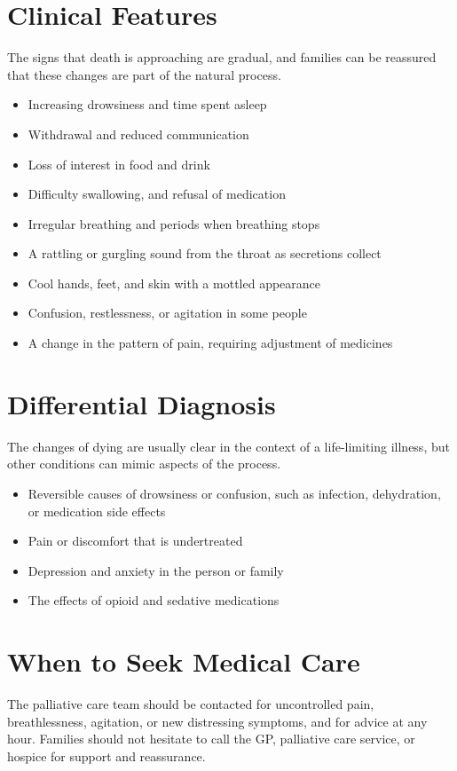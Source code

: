 \section*{Clinical Features}
The signs that death is approaching are gradual, and families can be reassured that these changes are part of the natural process.
\begin{itemize}
    \item Increasing drowsiness and time spent asleep
    \item Withdrawal and reduced communication
    \item Loss of interest in food and drink
    \item Difficulty swallowing, and refusal of medication
    \item Irregular breathing and periods when breathing stops
    \item A rattling or gurgling sound from the throat as secretions collect
    \item Cool hands, feet, and skin with a mottled appearance
    \item Confusion, restlessness, or agitation in some people
    \item A change in the pattern of pain, requiring adjustment of medicines
\end{itemize}

\section*{Differential Diagnosis}
The changes of dying are usually clear in the context of a life-limiting illness, but other conditions can mimic aspects of the process.
\begin{itemize}
    \item Reversible causes of drowsiness or confusion, such as infection, dehydration, or medication side effects
    \item Pain or discomfort that is undertreated
    \item Depression and anxiety in the person or family
    \item The effects of opioid and sedative medications
\end{itemize}

\section*{When to Seek Medical Care}
The palliative care team should be contacted for uncontrolled pain, breathlessness, agitation, or new distressing symptoms, and for advice at any hour. Families should not hesitate to call the GP, palliative care service, or hospice for support and reassurance.

